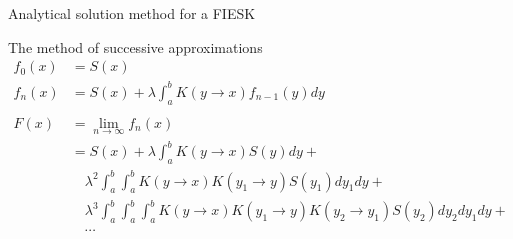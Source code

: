 \documentclass{beamer}
\begin{document}
\begin{frame}{Analytical solution method for a FIESK}

  \begin{beamerboxesrounded}{The method of successive approximations}
    \begin{align}
      f_0(x) & = S(x) \nonumber \\
      f_n(x) & = S(x) + \lambda \int_a^b K(y \to x)f_{n-1}(y)dy \nonumber \\
      & \quad \nonumber \\
      F(x) & = \lim_{n \to \infty} f_n(x) \nonumber \\
      & = S(x) + \lambda \int_a^b K(y \to x)S(y)dy + \nonumber \\
      & \quad \lambda^2 \int_a^b \int_a^b K(y \to x)K(y_1 \to y)S(y_1)dy_1dy +
      \nonumber \\
      & \quad \lambda^3 \int_a^b \int_a^b \int_a^b K(y \to x)K(y_1 \to y)
      K(y_2 \to y_1)S(y_2)dy_2dy_1dy + \nonumber \\
      & \quad \cdots \nonumber
    \end{align}
  \end{beamerboxesrounded}

\end{frame}
\end{document}
